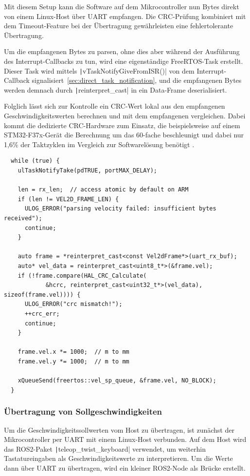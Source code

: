 Mit diesem Setup kann die Software auf dem Mikrocontroller nun Bytes direkt von
einem Linux-Host über UART empfangen. Die CRC-Prüfung kombiniert mit dem
Timeout-Feature bei der Übertragung gewährleisten eine fehlertolerante
Übertragung.

Um die empfangenen Bytes zu parsen, ohne dies aber während der Ausführung des
Interrupt-Callbacks zu tun, wird eine eigenständige FreeRTOS-Task erstellt.
Dieser Task wird mittels \texttt|vTaskNotifyGiveFromISR()| von dem
Interrupt-Callback signalisiert~\ref{sec:direct_task_notification}, und die
empfangenen Bytes werden demnach durch \texttt|reinterpret_cast| in ein
Data-Frame deserialisiert.

Folglich lässt sich zur Kontrolle ein CRC-Wert lokal aus den empfangenen
Geschwindigkeitswerten berechnen und mit dem empfangenen vergleichen. Dabei
kommt die dedizierte CRC-Hardware zum Einsatz, die beispielsweise auf einem
STM32-F37x-Gerät die Berechnung um das 60-fache beschleunigt und dabei nur 1,6\%
der Taktzyklen im Vergleich zur Softwarelösung benötigt \cite[S. 9]{AN4187}.

\begin{code}
\begin{verbatim}
  while (true) {
    ulTaskNotifyTake(pdTRUE, portMAX_DELAY);

    len = rx_len;  // access atomic by default on ARM
    if (len != VEL2D_FRAME_LEN) {
      ULOG_ERROR("parsing velocity failed: insufficient bytes received");
      continue;
    }

    auto frame = *reinterpret_cast<const Vel2dFrame*>(uart_rx_buf);
    auto* vel_data = reinterpret_cast<uint8_t*>(&frame.vel);
    if (!frame.compare(HAL_CRC_Calculate(
            &hcrc, reinterpret_cast<uint32_t*>(vel_data), sizeof(frame.vel)))) {
      ULOG_ERROR("crc mismatch!");
      ++crc_err;
      continue;
    }

    frame.vel.x *= 1000;  // m to mm
    frame.vel.y *= 1000;  // m to mm

    xQueueSend(freertos::vel_sp_queue, &frame.vel, NO_BLOCK);
  }
\end{verbatim}
\end{code}

\subsubsection{Übertragung von Sollgeschwindigkeiten}

Um die Geschwindigkeitssollwerten vom Host zu übertragen, ist zunächst der
Mikrocontroller per UART mit einem Linux-Host verbunden. Auf dem Host wird das
ROS2-Paket \texttt|teleop_twist_keyboard| verwendet, um weiterhin
Tastatureingaben als Geschwindigkeitswerte zu interpretieren. Um die Werte dann
über UART zu übertragen, wird ein kleiner ROS2-Node als Brücke erstellt.

